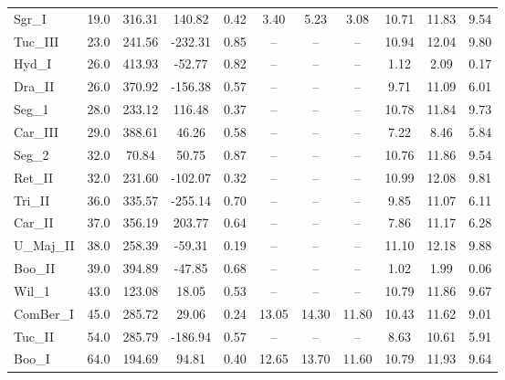 \begin{table*}
\begin{tabular}{lcccccccccc}
  \hline
  \hline
     Sgr\_I &      19.0 &  316.31 &  140.82 &  0.42 &   3.40 &       5.23 &       3.08 &   10.71 &         11.83 &          9.54 \\
   Tuc\_III &      23.0 &  241.56 & -232.31 &  0.85 &     -- &         -- &         -- &   10.94 &         12.04 &          9.80 \\
     Hyd\_I &      26.0 &  413.93 &  -52.77 &  0.82 &     -- &         -- &         -- &    1.12 &          2.09 &          0.17 \\
    Dra\_II &      26.0 &  370.92 & -156.38 &  0.57 &     -- &         -- &         -- &    9.71 &         11.09 &          6.01 \\
     Seg\_1 &      28.0 &  233.12 &  116.48 &  0.37 &     -- &         -- &         -- &   10.78 &         11.84 &          9.73 \\
   Car\_III &      29.0 &  388.61 &   46.26 &  0.58 &     -- &         -- &         -- &    7.22 &          8.46 &          5.84 \\
     Seg\_2 &      32.0 &   70.84 &   50.75 &  0.87 &     -- &         -- &         -- &   10.76 &         11.86 &          9.54 \\
    Ret\_II &      32.0 &  231.60 & -102.07 &  0.32 &     -- &         -- &         -- &   10.99 &         12.08 &          9.81 \\
    Tri\_II &      36.0 &  335.57 & -255.14 &  0.70 &     -- &         -- &         -- &    9.85 &         11.07 &          6.11 \\
    Car\_II &      37.0 &  356.19 &  203.77 &  0.64 &     -- &         -- &         -- &    7.86 &         11.17 &          6.28 \\
  U\_Maj\_II &      38.0 &  258.39 &  -59.31 &  0.19 &     -- &         -- &         -- &   11.10 &         12.18 &          9.88 \\
    Boo\_II &      39.0 &  394.89 &  -47.85 &  0.68 &     -- &         -- &         -- &    1.02 &          1.99 &          0.06 \\
     Wil\_1 &      43.0 &  123.08 &   18.05 &  0.53 &     -- &         -- &         -- &   10.79 &         11.86 &          9.67 \\
  ComBer\_I &      45.0 &  285.72 &   29.06 &  0.24 &  13.05 &      14.30 &      11.80 &   10.43 &         11.62 &          9.01 \\
    Tuc\_II &      54.0 &  285.79 & -186.94 &  0.57 &     -- &         -- &         -- &    8.63 &         10.61 &          5.91 \\
     Boo\_I &      64.0 &  194.69 &   94.81 &  0.40 &  12.65 &      13.70 &      11.60 &   10.79 &         11.93 &          9.64 \\

\end{tabular}
\end{table*}
